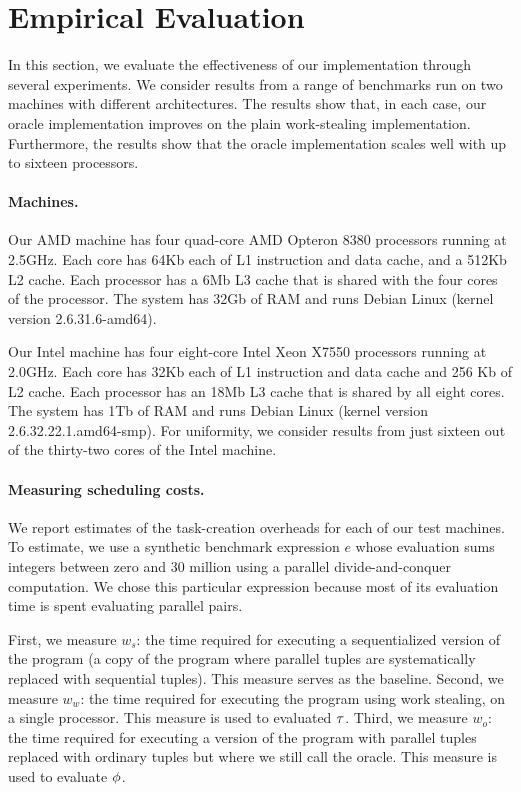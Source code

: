 \section{Empirical Evaluation}
\label{sec:exp}
\label{sec:empirical-evaluation}

In this section, we evaluate the effectiveness of our implementation
through several experiments. We consider results from a range of
benchmarks run on two machines with different architectures. The
results show that, in each case, our oracle implementation improves on
the plain work-stealing implementation. Furthermore, the results show
that the oracle implementation scales well with up to sixteen processors.

\paragraph{Machines.}

Our AMD machine has four quad-core AMD Opteron 8380 processors running
at 2.5GHz.  Each core has 64Kb each of L1 instruction and data cache,
and a 512Kb L2 cache. Each processor has a 6Mb L3 cache that is shared
with the four cores of the processor.  The system has 32Gb of RAM and
runs Debian Linux (kernel version 2.6.31.6-amd64).

Our Intel machine has four eight-core Intel Xeon X7550 processors
running at 2.0GHz. Each core has 32Kb each of L1 instruction and
data cache and 256 Kb of L2 cache. Each processor has an 18Mb L3 cache
that is shared by all eight cores. The system has 1Tb of RAM and runs
Debian Linux (kernel version 2.6.32.22.1.amd64-smp).
For uniformity, we consider results from just sixteen out of the
thirty-two cores of the Intel machine. 

\paragraph{Measuring scheduling costs.}

We report estimates of the task-creation overheads for each of our test
machines. To estimate, we use a synthetic benchmark expression $e$
whose evaluation sums integers between zero and 30 million using a
parallel divide-and-conquer computation. We chose this particular
expression because most of its evaluation time is spent evaluating
parallel pairs. 

First, we measure $w_s$: the time required for executing a
sequentialized version of the program (a copy of the program where
parallel tuples are systematically replaced with sequential tuples).
This measure serves as the baseline.  Second, we measure $w_w$: the
time required for executing the program using work stealing, on a
single processor.  This measure is used to evaluated ${\tau}$.  Third,
we measure $w_o$: the time required for executing a version of the
program with parallel tuples replaced with ordinary tuples but where
we still call the oracle. %
This measure is used to evaluate ${\phi}$.

